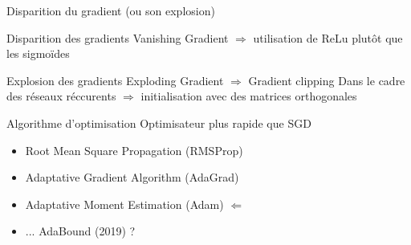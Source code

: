 \begin{frame}{Disparition du gradient (ou son explosion)}
\end{frame}

\begin{frame}{Disparition des gradients}
  Vanishing Gradient $\Rightarrow$ utilisation de ReLu plutôt que les sigmoïdes
  \vfill
\end{frame}

\begin{frame}{Explosion des gradients}
  Exploding Gradient $\Rightarrow$ Gradient clipping
  Dans le cadre des réseaux réccurents $\Rightarrow$ initialisation avec des matrices orthogonales
\end{frame}

\begin{frame}{Algorithme d'optimisation}
  Optimisateur plus rapide que SGD
  \begin{itemize}[<+(1)->]
  \item Root Mean Square Propagation (RMSProp)
  \item Adaptative Gradient Algorithm (AdaGrad)
  \item Adaptative Moment Estimation (Adam)    $\Leftarrow$
  \item ... AdaBound (2019) ?
 \end{itemize}
\end{frame}
